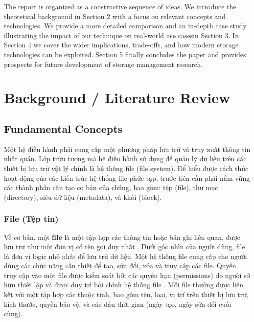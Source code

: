 \documentclass[12pt]{article}
\begin{document}
The report is organized as a constructive sequence of ideas. We introduce the theoretical background in Section 2 with a focus on relevant concepts and technologies. We provide a more detailed comparison and an in-depth case study illustrating the impact of our technique on real-world use casesin Section 3. In Section 4 we cover the wider implications, trade-offs, and how modern storage technologies can be exploited. Section 5 finally concludes the paper and provides prospects for future development of storage management research.


\section{Background / Literature Review}

\subsection{Fundamental Concepts}

Một hệ điều hành phải cung cấp một phương pháp lưu trữ và truy xuất thông tin nhất quán. Lớp trừu tượng mà hệ điều hành sử dụng để quản lý dữ liệu trên các thiết bị lưu trữ vật lý chính là hệ thống file (file system). Để hiểu được cách thức hoạt động của các kiến trúc hệ thống file phức tạp, trước tiên cần phải nắm vững các thành phần cấu tạo cơ bản của chúng, bao gồm: tệp (file), thư mục (directory), siêu dữ liệu (metadata), và khối (block).

\subsubsection{File (Tệp tin)}
Về cơ bản, một \textbf{file} là một tập hợp các thông tin hoặc bản ghi liên quan, được lưu trữ như một đơn vị có tên gọi duy nhất \parencite{EMC2012InformationStorage}. Dưới góc nhìn của người dùng, file là đơn vị logic nhỏ nhất để lưu trữ dữ liệu. Một hệ thống file cung cấp cho người dùng các chức năng cần thiết để tạo, sửa đổi, xóa và truy cập các file. Quyền truy cập vào một file được kiểm soát bởi các quyền hạn (permissions) do người sở hữu thiết lập và được duy trì bởi chính hệ thống file \parencite{Silberschatz2018}. Mỗi file thường được liên kết với một tập hợp các thuộc tính, bao gồm tên, loại, vị trí trên thiết bị lưu trữ, kích thước, quyền bảo vệ, và các dấu thời gian (ngày tạo, ngày sửa đổi cuối cùng).
\end{document}
